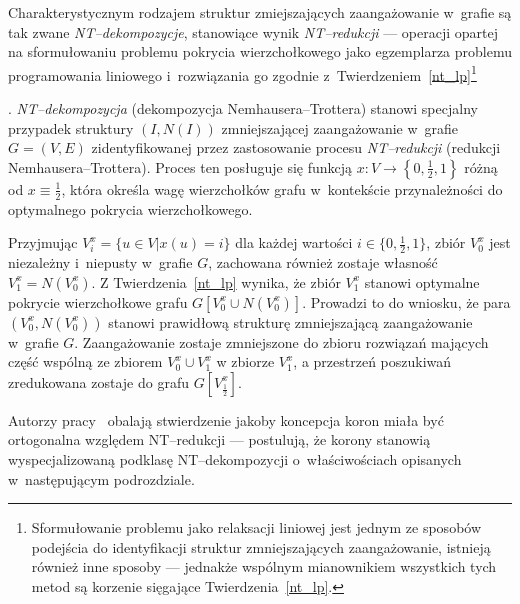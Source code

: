 \par{
  Charakterystycznym rodzajem struktur zmiejszających zaangażowanie w~grafie są tak zwane \emph{NT--dekompozycje}, stanowiące wynik \emph{NT--redukcji} --- operacji opartej na sformułowaniu problemu pokrycia wierzchołkowego jako egzemplarza problemu programowania liniowego i~rozwiązania go zgodnie z~Twierdzeniem~\ref{nt_lp}\footnote{Sformułowanie problemu jako relaksacji liniowej jest jednym ze sposobów podejścia do identyfikacji struktur zmniejszających zaangażowanie, istnieją również inne sposoby --- jednakże wspólnym mianownikiem wszystkich tych metod są korzenie sięgające Twierdzenia~\ref{nt_lp}.}
  \begin{definition}.
    \emph{NT--dekompozycja} (dekompozycja Nemhausera--Trottera) stanowi specjalny przypadek struktury $(I, N(I))$ zmniejszającej zaangażowanie w~grafie $G=(V, E)$ zidentyfikowanej przez zastosowanie procesu \emph{NT--redukcji} (redukcji Nemhausera--Trottera).
    Proces ten posługuje się funkcją $x: V \rightarrow \left\{0, \frac{1}{2}, 1\right\}$ różną od $x \equiv \frac{1}{2}$, która określa wagę wierzchołków grafu w~kontekście przynależności do optymalnego pokrycia wierzchołkowego.
  \end{definition}
  Przyjmując $V_i^x=\{u \in V| x(u)=i\}$ dla każdej wartości $i\in \{0, \frac{1}{2}, 1\}$, zbiór $V_0^x$ jest niezależny i~niepusty w~grafie $G$, zachowana również zostaje własność $V_1^x = N(V_0^x)$.
  Z Twierdzenia~\ref{nt_lp} wynika, że zbiór $V_1^x$ stanowi optymalne pokrycie wierzchołkowe grafu $G[V_0^x \cup N(V_0^x)]$.
  Prowadzi to do wniosku, że para $(V_0^x, N(V_0^x))$ stanowi prawidłową strukturę zmniejszającą zaangażowanie w~grafie $G$.
  Zaangażowanie zostaje zmniejszone do zbioru rozwiązań mających część wspólną ze zbiorem $V_0^x \cup V_1^x$ w zbiorze $V_1^x$, a przestrzeń poszukiwań zredukowana zostaje do grafu $G[V_\frac{1}{2}^x]$.
}
\par{
  Autorzy pracy~\cite{chlebik:crown} obalają stwierdzenie jakoby koncepcja koron miała być ortogonalna względem NT--redukcji --- postulują, że korony stanowią wyspecjalizowaną podklasę NT--dekompozycji o~właściwościach opisanych w~następującym podrozdziale.
}
